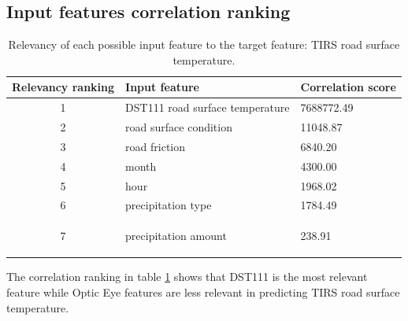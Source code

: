 	\subsection{Input features correlation ranking}
	\begin{table}[H]
		\centering
		\caption{Relevancy of each possible input feature to the target feature: TIRS road surface temperature. }
		\begin{tabular}[3]{c | l | l }
    			Relevancy ranking & Input feature & Correlation score  \\
			 \hline
			1 & DST111 road surface temperature & 7688772.49 \\ \hline
			2 & road surface condition & 11048.87 \\ \hline
			3 & road friction & 6840.20 \\ \hline
			4 & month & 4300.00 \\ \hline
			5 & hour & 1968.02 \\ \hline
			6 & precipitation type & 1784.49 \\ \hline
			7 & precipitation amount & 238.91 
 
			\label{table:feature_comparison_tirs}
		\end{tabular}
	\end{table}

	The correlation ranking in table \ref{table:feature_comparison_tirs} shows that DST111 is the most relevant feature while Optic Eye features are less relevant in predicting TIRS road surface temperature.

